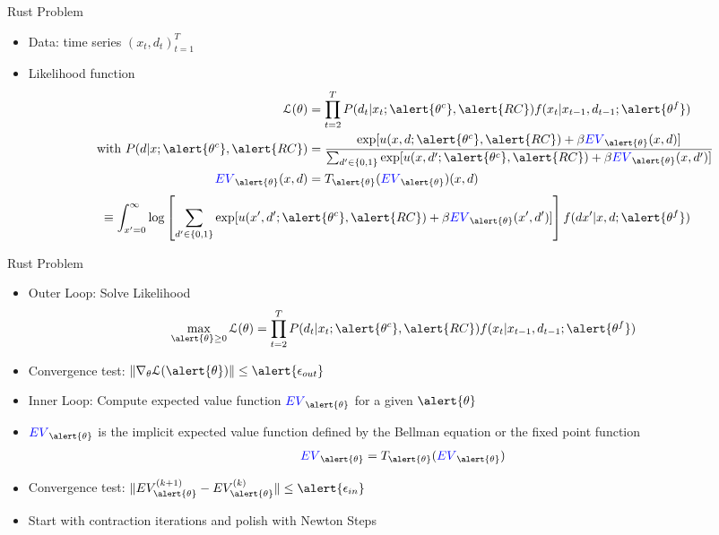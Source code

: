 \documentclass[aspectratio=169,11pt]{beamer}
\begin{document}
\begin{frame}{Rust Problem}
\begin{itemize}
\item Data: time series $(x_t,d_t)_{t=1}^T$
\item Likelihood function
\begin{align*}
\mathcal{L}(\theta) &= \prod_{t=2}^T P(d_t | x_t; \alert{\theta^c}, \alert{RC}) f(x_t | x_{t-1}, d_{t-1};\alert{\theta^f})\\
\mbox{ with }  P(d | x; \alert{\theta^c}, \alert{RC}) &= \frac{\exp[u(x,d;\alert{\theta^c},\alert{RC}) + \beta \textcolor{blue}{EV}_{\alert{\theta}}(x,d)]}
{\sum_{d' \in \{0,1\}} \exp[u(x,d';\alert{\theta^c},\alert{RC}) + \beta \textcolor{blue}{EV}_{\alert{\theta}}(x,d')]}\\
\textcolor{blue}{EV}_{\alert{\theta}}(x,d) &= T_{\alert{\theta}}(\textcolor{blue}{EV}_{\alert{\theta}})(x,d)\\
\end{align*}
\vspace{-1cm}
\begin{align*}
\equiv \int_{x'=0}^{\infty} &\log \left[ \sum_{d' \in \{0,1\}} \exp[u(x',d';\alert{\theta^c},\alert{RC}) + \beta \textcolor{blue}{EV}_{\alert{\theta}}(x',d')]  \right] f(dx' | x,d;\alert{\theta^f})
\end{align*}
\end{itemize}
\end{frame}


\begin{frame}{Rust Problem}
\begin{itemize}
\item Outer Loop: Solve Likelihood
\begin{align*}
\max_{\alert{\theta} \geq 0} \mathcal{L}(\theta) &= \prod_{t=2}^T P(d_t | x_t; \alert{\theta^c}, \alert{RC}) f(x_t | x_{t-1}, d_{t-1};\alert{\theta^f})\\
\end{align*}
\item Convergence test: $\norm{\nabla_{\theta} \mathcal{L}(\alert{\theta})} \leq \alert{\epsilon_{out}}$
\item Inner Loop: Compute expected value function $ \textcolor{blue}{EV}_{\alert{\theta}}$ for a given $\alert{\theta}$
\item $ \textcolor{blue}{EV}_{\alert{\theta}}$ is the implicit expected value function defined by the Bellman equation or the fixed point function
\begin{align*}
 \textcolor{blue}{EV}_{\alert{\theta}} = T_{\alert{\theta}}( \textcolor{blue}{EV}_{\alert{\theta}})
\end{align*}
\item Convergence test: $\norm{ EV^{(k+1)}_{\alert{\theta}} - EV^{(k)}_{\alert{\theta}} } \leq \alert{\epsilon_{in}}$
\item Start with contraction iterations and polish with Newton Steps
\end{itemize}
\end{frame}
\end{document}

